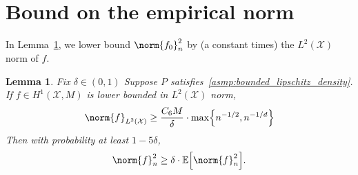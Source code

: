 \documentclass[twoside]{article}
\newcommand{\1}{\mathbf{1}}
\newcommand{\Xset}{\mathcal{X}}
\newcommand{\Leb}{L}
\newcommand{\Ebb}{\mathbb{E}}
\newtheorem{lemma}{Lemma}
\theoremstyle{definition}
\theoremstyle{remark}
\begin{document}
\section{Bound on the empirical norm}
\label{sec:empirical_norm}

In Lemma~\ref{lem:empirical_norm_sobolev}, we lower bound $\norm{f_0}_n^2$ by (a constant times) the $\Leb^2(\Xset)$ norm of $f$.

\begin{lemma}
	\label{lem:empirical_norm_sobolev}
	Fix $\delta \in (0,1)$ Suppose $P$ satisfies~\ref{asmp:bounded_lipschitz_density}. If $f \in H^1(\Xset,M)$ is lower bounded in $\Leb^2(\Xset)$ norm,
	\begin{equation}
	\label{eqn:empirical_norm_sobolev_1}
	\norm{f}_{\Leb^2(\Xset)} \geq \frac{C_6 M}{\delta} \cdot \max\Bigl\{n^{-1/2},n^{-1/d}\Bigr\}
	\end{equation}
	Then with probability at least $1 - 5 \delta$,
	\begin{equation}
	\label{eqn:empirical_norm_sobolev}
	\norm{f}_n^2 \geq \delta \cdot \Ebb\Bigl[\norm{f}_n^2\Bigr].
	\end{equation}
\end{lemma}
\end{document}
